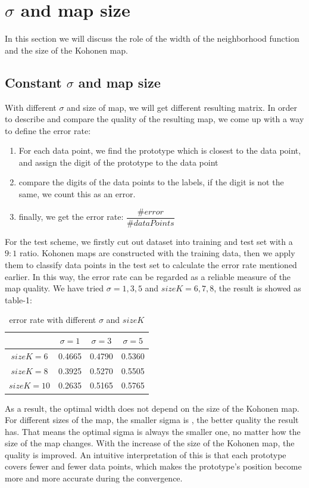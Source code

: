 \documentclass[a4paper, 12pt]{article}
\begin{document}
\section{$\sigma$ and map size}
In this section we will discuss the role of the width of the neighborhood function and the size of the Kohonen map.
\subsection{Constant $\sigma$ and map size}
With different $\sigma$ and size of map, we will get different
resulting matrix. In order to describe and compare the quality of the
resulting map, we come up with a way to define the error rate:
\begin{enumerate}
\item For each data point, we find the prototype which is closest to
  the data point, and assign the digit of the prototype to the data
  point
\item compare the digits of the data points to the labels, if the
  digit is not the same, we count this as an error.
\item finally, we get the error rate: $\dfrac{\#error}{\#dataPoints}$
\end{enumerate}
For the test scheme, we firstly cut out dataset into training and test
set with a $9:1$ ratio. Kohonen maps are constructed with the
training data, then we apply them to classify data points in the test
set to calculate the error rate mentioned earlier. In this way, the
error rate can be regarded as a reliable measure of the map quality.
We have tried $\sigma = 1, 3, 5$ and $sizeK = 6, 7, 8$, the result is showed as table-1:
\begin{table}[!hbp]
\centering
\begin{tabular}{|c|c|c|c|}
\hline
 & $\sigma = 1$ & $\sigma = 3$ & $\sigma = 5$\\
\hline
$sizeK = 6$ &  0.4665 & 0.4790 & 0.5360\\
\hline
$sizeK = 8$ & 0.3925 & 0.5270 & 0.5505\\
\hline
$sizeK = 10$ & 0.2635 & 0.5165 & 0.5765\\
\hline
\end{tabular}
\caption{error rate with different $\sigma$ and $sizeK$}
\end{table}
As a result, the optimal width does not depend on the size of the
Kohonen map. For different sizes of the map, the smaller sigma is ,
the better quality the result has. That means the optimal sigma is
always the smaller one, no matter how the size of the map
changes. With the increase of the size of the Kohonen map, the quality
is improved. An intuitive interpretation of this is that each prototype
covers fewer and fewer data points, which makes the prototype's
position become more and more accurate during the convergence.
\end{document}
